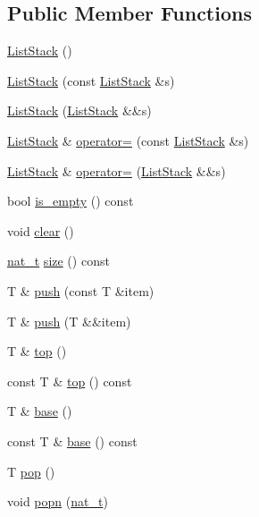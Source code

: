 \subsection*{Public Member Functions}
\begin{DoxyCompactItemize}
\item 
\hyperlink{class_designar_1_1_list_stack_af48928af17e98272785d4f07d229ac12}{List\+Stack} ()
\item 
\hyperlink{class_designar_1_1_list_stack_adee9acd5a1b6f6e9327fc20126caa2ed}{List\+Stack} (const \hyperlink{class_designar_1_1_list_stack}{List\+Stack} \&s)
\item 
\hyperlink{class_designar_1_1_list_stack_ab0b28b16213cbc71e6132b3508838013}{List\+Stack} (\hyperlink{class_designar_1_1_list_stack}{List\+Stack} \&\&s)
\item 
\hyperlink{class_designar_1_1_list_stack}{List\+Stack} \& \hyperlink{class_designar_1_1_list_stack_a324b12f4699962b0cbbdf12c80fbba44}{operator=} (const \hyperlink{class_designar_1_1_list_stack}{List\+Stack} \&s)
\item 
\hyperlink{class_designar_1_1_list_stack}{List\+Stack} \& \hyperlink{class_designar_1_1_list_stack_ae74bc2ebc11f8ebb3d98e700f4cbe9c3}{operator=} (\hyperlink{class_designar_1_1_list_stack}{List\+Stack} \&\&s)
\item 
bool \hyperlink{class_designar_1_1_list_stack_a78ec42650d4028911a0054f6baaa673a}{is\+\_\+empty} () const
\item 
void \hyperlink{class_designar_1_1_list_stack_aef07f86ff93ad1742207df436ba71aaa}{clear} ()
\item 
\hyperlink{namespace_designar_aa72662848b9f4815e7bf31a7cf3e33d1}{nat\+\_\+t} \hyperlink{class_designar_1_1_list_stack_abec63f99f62a9b7d92e1a051767017dc}{size} () const
\item 
T \& \hyperlink{class_designar_1_1_list_stack_a02d19090b599fd54ebb5e693d0a8d2d0}{push} (const T \&item)
\item 
T \& \hyperlink{class_designar_1_1_list_stack_a96bb73a3658f95565769e8b50c903f88}{push} (T \&\&item)
\item 
T \& \hyperlink{class_designar_1_1_list_stack_a5b6e47be80da93039d31cd885e97cf34}{top} ()
\item 
const T \& \hyperlink{class_designar_1_1_list_stack_a6eafdfa1a1a43b4cbbe27730a7dcffd3}{top} () const
\item 
T \& \hyperlink{class_designar_1_1_list_stack_a40833af5e19d5d400a962fafb2c449a3}{base} ()
\item 
const T \& \hyperlink{class_designar_1_1_list_stack_a98ea1c6dff17d53b810e6fedae85340c}{base} () const
\item 
T \hyperlink{class_designar_1_1_list_stack_a1a8a0fb51e9a31cf7b5d103a067e0cc4}{pop} ()
\item 
void \hyperlink{class_designar_1_1_list_stack_afe33f82099d4ec5f62848323edf66d30}{popn} (\hyperlink{namespace_designar_aa72662848b9f4815e7bf31a7cf3e33d1}{nat\+\_\+t})
\end{DoxyCompactItemize}


